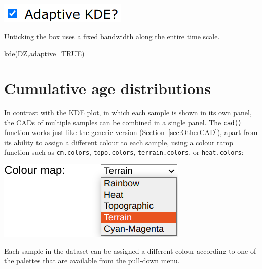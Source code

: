 \begin{refsection}
\begin{enumerate}
\noindent\begin{minipage}[t]{.2\linewidth}
\strut\vspace*{-\baselineskip}\newline
\includegraphics[width=\linewidth]{../figures/detritalKDEadaptive.png}
\end{minipage}
\begin{minipage}[t]{.8\linewidth}
Unticking the box uses a fixed bandwidth along the entire time scale.
\end{minipage}

\begin{console}
kde(DZ,adaptive=TRUE)
\end{console}

\end{enumerate}

\section{Cumulative age distributions}

In contrast with the KDE plot, in which each sample is shown in its
own panel, the CADs of multiple samples can be combined in a single
panel. The \texttt{cad()} function works just like the generic version
(Section~\ref{sec:OtherCAD}), apart from its ability to assign a
different colour to each sample, using a colour ramp function such as
\texttt{cm.colors}, \texttt{topo.colors}, \texttt{terrain.colors}, or
\texttt{heat.colors}:\\

\noindent\begin{minipage}[t]{.32\linewidth}
\strut\vspace*{-\baselineskip}\newline
\includegraphics[width=\linewidth]{../figures/detritalCADcol.png}
\end{minipage}
\begin{minipage}[t]{.68\linewidth}
  Each sample in the dataset can be assigned a different colour
  according to one of the palettes that are available from the
  pull-down menu.
\end{minipage}


\end{refsection}
